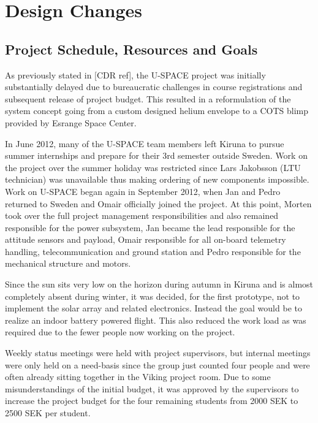 \newpage
\chapter{Design Changes}
\label{chap:design_changes}
%
%
\section{Project Schedule, Resources and Goals}
\label{sec:project_changes}
%
As previously stated in [CDR ref], the U-SPACE project was initially substantially delayed due to bureaucratic challenges in course registrations and subsequent release of project budget. This resulted in a reformulation of the system concept going from a custom designed helium envelope to a \ac{COTS} blimp provided by Esrange Space Center.

In June 2012, many of the U-SPACE team members left Kiruna to pursue summer internships and prepare for their 3rd semester outside Sweden. Work on the project over the summer holiday was restricted since Lars Jakobsson (LTU technician) was unavailable thus making ordering of new components impossible. Work on U-SPACE began again in September 2012, when Jan and Pedro returned to Sweden and Omair officially joined the project. At this point, Morten took over the full project management responsibilities and also remained responsible for the power subsystem, Jan became the lead responsible for the attitude sensors and payload, Omair responsible for all on-board telemetry handling, telecommunication and ground station and Pedro responsible for the mechanical structure and motors.

Since the sun sits very low on the horizon during autumn in Kiruna and is almost completely absent during winter, it was decided, for the first prototype, not to implement the solar array and related electronics. Instead the goal would be to realize an indoor battery powered flight. This also reduced the work load as was required due to the fewer people now working on the project.

Weekly status meetings were held with project supervisors, but internal meetings were only held on a need-basis since the group just counted four people and were often already sitting together in the Viking project room. 
Due to some misunderstandings of the initial budget, it was approved by the supervisors to increase the project budget for the four remaining students from 2000 SEK to 2500 SEK per student. 


